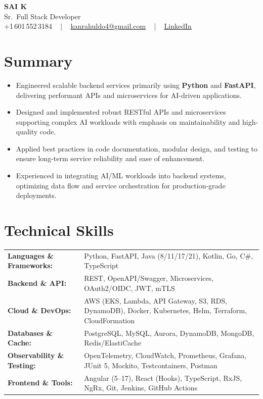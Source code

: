 \documentclass[letterpaper,11pt]{article}
\newcommand{\resumeItem}[1]{
  \item\footnotesize{
    {#1 \vspace{-2pt}}
  }
}
\newcommand{\resumeItemListStart}{\begin{itemize}[leftmargin=*]}
\newcommand{\resumeItemListEnd}{\end{itemize}\vspace{-5pt}}
\begin{document}
\begin{center}
    {\fontsize{14pt}{12pt}\selectfont \textbf{\MakeUppercase{Sai K}}}\\ \vspace{2pt}
    \fontsize{10pt}{12pt}\selectfont Sr.\ Full Stack Developer\\ \vspace{2pt}
    \fontsize{10pt}{12pt}\selectfont +1\,601\,552\,3184 ~ | ~
    \href{mailto:kanrahuldo4@gmail.com}{kanrahuldo4@gmail.com} ~ | ~
    \href{https://www.linkedin.com/in/srrrk/}{\color{blue}\underline{LinkedIn}}
    \vspace{-10pt}
\end{center}

\section{Summary}
\fontsize{9pt}{10pt}\selectfont
\resumeItemListStart
  \resumeItem{Engineered scalable backend services primarily using \textbf{Python} and \textbf{FastAPI}, delivering performant APIs and microservices for AI-driven applications.}
  \resumeItem{Designed and implemented robust RESTful APIs and microservices supporting complex AI workloads with emphasis on maintainability and high-quality code.}
  \resumeItem{Applied best practices in code documentation, modular design, and testing to ensure long-term service reliability and ease of enhancement.}
  \resumeItem{Experienced in integrating AI/ML workloads into backend systems, optimizing data flow and service orchestration for production-grade deployments.}
\resumeItemListEnd
\vspace{-6pt}

\section{Technical Skills}
\vspace{-14pt}
\begin{table}[h]
\fontsize{9pt}{10pt}\selectfont
\begin{tabular}{p{0.3\linewidth} p{0.7\linewidth}}
\textbf{Languages \& Frameworks:} & Python, FastAPI, Java (8/11/17/21), Kotlin, Go, C\#, TypeScript \\
\textbf{Backend \& API:} & REST, OpenAPI/Swagger, Microservices, OAuth2/OIDC, JWT, mTLS \\
\textbf{Cloud \& DevOps:} & AWS (EKS, Lambda, API Gateway, S3, RDS, DynamoDB), Docker, Kubernetes, Helm, Terraform, CloudFormation \\
\textbf{Databases \& Cache:} & PostgreSQL, MySQL, Aurora, DynamoDB, MongoDB, Redis/ElastiCache \\
\textbf{Observability \& Testing:} & OpenTelemetry, CloudWatch, Prometheus, Grafana, JUnit 5, Mockito, Testcontainers, Postman \\
\textbf{Frontend \& Tools:} & Angular (5--17), React (Hooks), TypeScript, RxJS, NgRx, Git, Jenkins, GitHub Actions \\
\end{tabular}
\end{table}
\vspace{-15pt}
\end{document}
